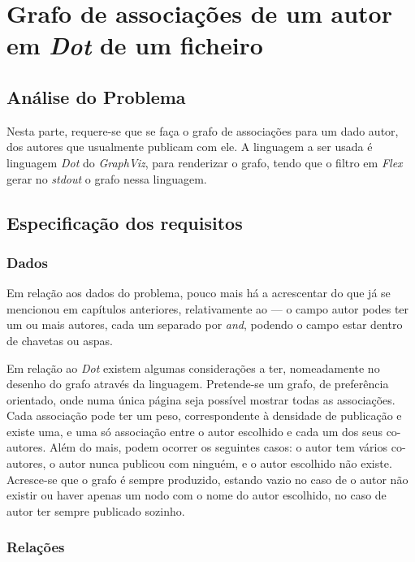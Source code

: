 \chapter{Grafo de associações de um autor em \emph{Dot} de um ficheiro \BibTeX}
\label{chap:c}

\section{Análise do Problema}
\label{sec:cp:c}
Nesta parte, requere-se que se faça o grafo de associações para um dado autor,
dos autores que usualmente publicam com ele. A linguagem a ser usada é linguagem
\emph{Dot} do \emph{GraphViz}, para renderizar o grafo, tendo que
o filtro em \emph{Flex} gerar no \emph{stdout} o grafo nessa
linguagem.   

\section{Especificação dos requisitos}
\label{sec:spec:c}

\subsection{Dados}

Em relação aos dados do problema, pouco mais há a acrescentar do que
já se mencionou em capítulos anteriores, relativamente ao
 --- o campo autor podes ter um ou mais autores, cada
um separado por \emph{and}, podendo o campo estar dentro de chavetas
ou aspas.

Em relação ao \emph{Dot} existem algumas considerações a ter,
nomeadamente no desenho do grafo através da linguagem. Pretende-se um
grafo, de preferência orientado, onde numa única página seja possível
mostrar todas as associações. Cada associação pode ter um peso,
correspondente à densidade de publicação e existe uma, e uma só
associação entre o autor escolhido e cada um dos seus co-autores. Além
do mais, podem ocorrer os seguintes casos: o autor tem vários
co-autores, o autor nunca publicou com ninguém, e o autor escolhido
não existe. Acresce-se que o grafo é sempre produzido, estando vazio
no caso de o autor não existir ou haver apenas um nodo com o nome do
autor escolhido, no caso de autor ter sempre publicado sozinho.

\subsection{Relações}

